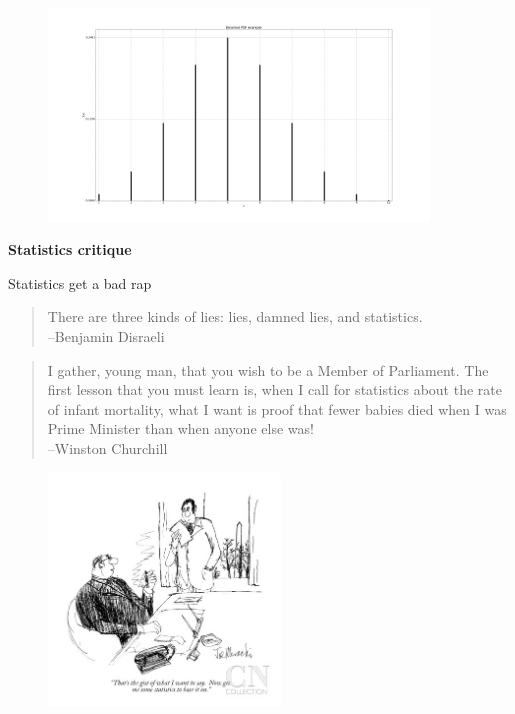 \documentclass[aspectratio=1610,pdftex,dvipsnames,compress,xcolor={dvipsnames}]{beamer}
\begin{document}
\begin{frame}{}
    \begin{figure}
        \centering
        \includegraphics[width=0.90\textwidth]{binomial.pdf.png}
    \end{figure}
\end{frame}


\begin{frame}[plain]{}
    \centering\LARGE\textbf{Statistics critique}
\end{frame}


\addtocounter{framenumber}{-1}
\begin{frame}{Statistics get a bad rap}
    \begin{quote}
        There are three kinds of lies:  lies, damned lies, and statistics.\\
        --Benjamin Disraeli
    \end{quote}

    \vspace{0.25in}

    \begin{quote}
        I gather, young man, that you wish to be a Member of Parliament. The first lesson that you must learn is, when I call for statistics about the rate of infant mortality, what I want is proof that fewer babies died when I was Prime Minister than when anyone else was!\\
        --Winston Churchill
    \end{quote}
\end{frame}


\begin{frame}{}
    \begin{figure}
        \centering
        \includegraphics[width=0.55\textwidth]{cartoon.jpg}
    \end{figure}
\end{frame}
\end{document}
